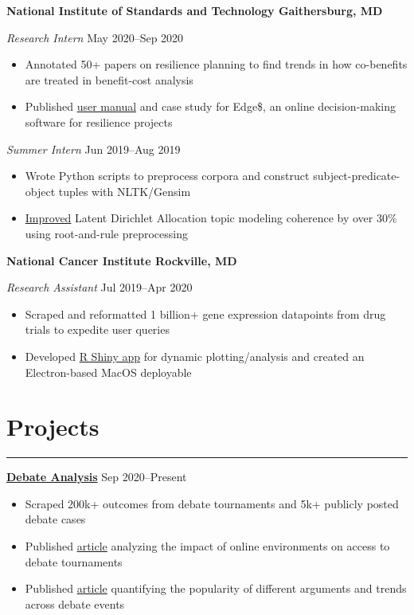\documentclass[11pt]{article}
\newcommand{\resumesection}[1]{\vspace{-0.6cm}\section*{\color{highlight}#1}\vspace{-0.3cm}\hrule\vspace{0.2cm}}
\begin{document}
\textbf{National Institute of Standards and Technology \hfill Gaithersburg, MD}\par

\textit{Research Intern} \hfill May 2020--Sep 2020
\begin{itemize}
	\item Annotated 50+ papers on resilience planning to find trends in how co-benefits are treated in benefit-cost analysis
	\item Published \href{https://nvlpubs.nist.gov/nistpubs/SpecialPublications/NIST.SP.1260.pdf}{user manual} and case study for Edge\$, an online decision-making software for resilience projects
\end{itemize}\par

\textit{Summer Intern} \hfill Jun 2019--Aug 2019
\begin{itemize}
	\item Wrote Python scripts to preprocess corpora and construct subject-predicate-object tuples with NLTK/Gensim
	\item \href{https://github.com/petezh/RR-NLP-Tools}{Improved} Latent Dirichlet Allocation topic modeling coherence by over 30\% using root-and-rule preprocessing
\end{itemize}

\textbf{National Cancer Institute \hfill Rockville, MD}\par

\textit{Research Assistant} \hfill Jul 2019--Apr 2020 \par
\begin{itemize}
	\item Scraped and reformatted 1 billion+ gene expression datapoints from drug trials to expedite user queries
	\item Developed \href{https://github.com/petezh/TP-Workbench}{R Shiny app} for dynamic plotting/analysis and created an Electron-based MacOS deployable
\end{itemize}\vspace{0.1cm}

\resumesection{Projects}

\textbf{\href{https://github.com/petezh/E-Debate}{Debate Analysis}} \hfill Sep 2020--Present\par
\begin{itemize}
	\item Scraped 200k+ outcomes from debate tournaments and 5k+ publicly posted debate cases
	\item Published \href{https://www.vbriefly.com/2020/12/31/five-trends-among-e-debate-competitors-by-peter-zhang/}{article} analyzing the impact of online environments on access to debate tournaments
	\item Published \href{https://www.vbriefly.com/2021/01/22/disclosure-in-numbers-by-peter-zhang/}{article} quantifying the popularity of different arguments and trends across debate events
\end{itemize}\vspace{0.1cm} \par
\end{document}
